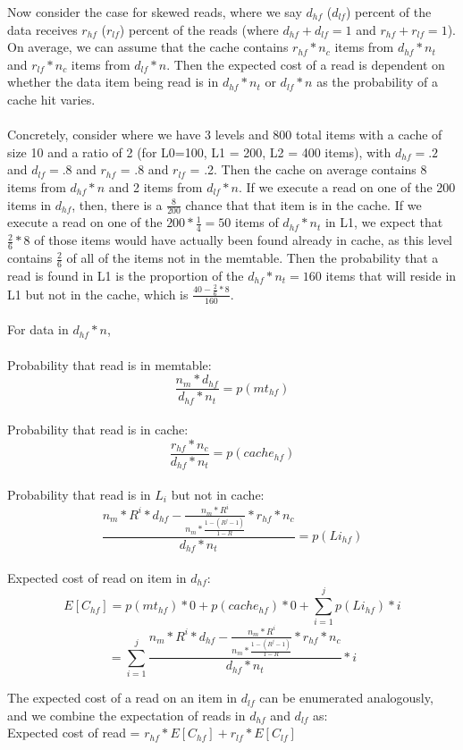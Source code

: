 \documentclass{sig-alternate-05-2015}
\begin{document}
Now consider the case for skewed reads, where we say $d_{hf}$ ($d_{lf}$) percent of the data receives $r_{hf}$ ($r_{lf}$) percent of the reads (where $d_{hf} + d_{lf} = 1$ and $r_{hf} + r_{lf} = 1$). On average, we can assume that the cache contains $r_{hf} * n_c$ items from $d_{hf} * n_t$ and $r_{lf} * n_c$ items from $d_{lf} * n$. Then the expected cost of a read is dependent on whether the data item being read is in $d_{hf} * n_t$ or $d_{lf} * n$ as the probability of a cache hit varies.\\ \\
Concretely, consider where we have 3 levels and 800 total items with a cache of size 10 and a ratio of 2  (for L0=100, L1 = 200, L2 = 400 items), with $d_{hf} = .2$ and $d_{lf} = .8$ and $r_{hf}$ = .8 and $r_{lf}$ = .2. Then the cache on average contains 8 items from $d_{hf} * n$ and 2 items from $d_{lf}*n$. If we execute a read on one of the 200 items in $d_{hf}$, then, there is a $\frac{8}{200}$ chance that that item is in the cache. If we execute a read on one of the $200*\frac{1}{4} = 50$ items of  $d_{hf} * n_t$ in L1, we expect that $\frac{2}{6} * 8$ of those items would have actually been found already in cache, as this level contains $\frac{2}{6}$ of all of the items not in the memtable. Then the probability that a read is found in L1 is the proportion of the $d_{hf} * n_t = 160$ items that will reside in L1 but not in the cache, which is $\frac{40 - \frac{2}{6} * 8}{160}$. \\ \\
For data in $d_{hf} * n$, \\ \\
Probability that read is in memtable:
$$\frac{n_m*d_{hf}}{d_{hf} *n_t}  = p(mt_{hf})$$\\
Probability that read is in cache:
$$\frac{r_{hf} * n_c}{d_{hf} * n_t} = p(cache_{hf})$$ \\
Probability that read is in $L_i$ but not in cache:
$$ \frac{n_m * R^{i}*d_{hf} - \frac{n_m * R^{i}}{n_m * \frac{1-(R^j-1)}{1-R}} * r_{hf} * n_c}{d_{hf} * n_t}  = p(Li_{hf})$$ \\
Expected cost of read on item in $d_{hf}$:
$$E[C_{hf}]= p(mt_{hf}) * 0  + p(cache_{hf}) * 0 + \sum_{i=1}^j p(Li_{hf}) * i$$
$$ = \sum_{i=1}^j \frac{n_m * R^{i}*d_{hf} - \frac{n_m * R^{i}}{n_m * \frac{1-(R^j-1)}{1-R}} * r_{hf} * n_c}{d_{hf} * n_t}  * i$$

The expected cost of a read on an item in $d_{lf}$ can be enumerated analogously, and we combine the expectation of reads in $d_{hf}$ and $d_{lf}$ as: \\
Expected cost of read = $r_{hf} * E[C_{hf}] + r_{lf} * E[C_{lf}]$ \\ \\
\end{document}
